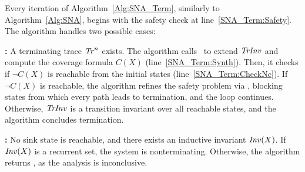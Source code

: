 Every iteration of Algorithm~\ref{Alg:SNA_Term}, similarly to Algorithm~\ref{Alg:SNA},
begins with the safety check at line~\ref{SNA_Term:Safety}.
The algorithm handles two possible cases:

\textbf{\UNSAFE:} A terminating trace $\mathit{Tr}^n$ exists.
The algorithm calls 
\trInvSynthesis\ to extend $\mathit{TrInv}$ and compute the coverage formula $C(X)$ (line~\ref{SNA_Term:Synth}).
Then, it checks if $\lnot C(X)$ is reachable from the initial states (line~\ref{SNA_Term:CheckNc}).
If $\lnot C(X)$ is reachable, the algorithm refines the safety problem via \blockTerm, blocking
states from which every path leads to termination, and the loop continues.
Otherwise, $\mathit{TrInv}$ is a transition invariant over all reachable states, and the algorithm concludes termination.

\textbf{\SAFE:} No sink state is reachable, and there exists an inductive invariant $\mathit{Inv}(X)$. 
If $\mathit{Inv}(X)$ is a recurrent set, the system is nonterminating. 
Otherwise, the algorithm returns \UNKNOWN, as the analysis is inconclusive.

